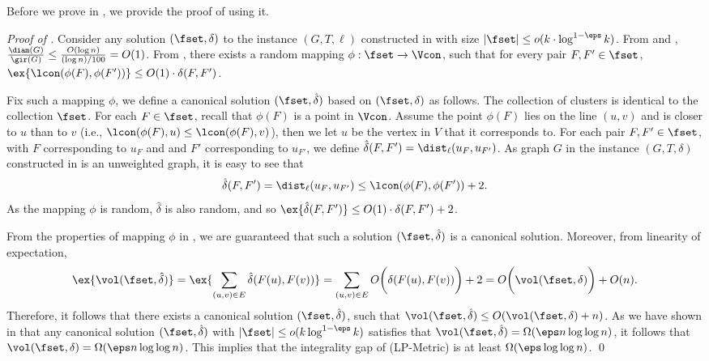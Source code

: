 Before we prove  in , we provide the proof of  using it.

\emph{Proof of .}
Consider any solution $(\fset,\delta)$ to the instance $(G,T,\ell)$ constructed in  with size $|\fset|\le o(k\cdot \log^{1-\eps}k)$. 
From  and , $\frac{\diam(G)}{\gir(G)}\le \frac{O(\log n)}{(\log n)/100}=O(1)$. From , there exists a random mapping $\phi: \fset \to \Vcon$, such that for every pair $F,F'\in \fset$,
$\ex{\lcon(\phi(F),\phi(F'))} \le O(1)\cdot  \delta(F,F')$. 

Fix such a mapping $\phi$, we define a canonical solution $(\fset,\hat \delta)$ based on $(\fset,\delta)$ as follows. The collection of clusters is identical to the collection $\fset$. For each $F\in \fset$, recall that $\phi(F)$ is a point in $\Vcon$. Assume the point $\phi(F)$ lies on the line $(u,v)$ and is closer to $u$ than to $v$ (i.e., $\lcon(\phi(F),u)\le\lcon(\phi(F),v)$), then we let $u$ be the vertex in $V$ that it corresponds to. For each pair $F,F'\in \fset$, with $F$ corresponding to $u_F$ and and $F'$ corresponding to $u_{F'}$, we define $\hat\delta(F,F')=\dist_{\ell}(u_F,u_{F'})$. 
As graph $G$ in the instance $(G,T,\delta)$ constructed in  is an unweighted graph, it is easy to see that
\[\hat\delta(F,F')=\dist_{\ell}(u_F,u_{F'})\le \lcon(\phi(F),\phi(F'))+2.\]
As the mapping $\phi$ is random, $\hat{\delta}$ is also random, and so $\ex{\hat\delta(F,F')}\le O(1)\cdot  \delta(F,F') +2$.

From the properties of mapping $\phi$ in , we are guaranteed that such a solution $(\fset,\hat\delta)$ is a canonical solution. Moreover, from linearity of expectation, 
$$\ex{\vol(\fset,\hat\delta)}
=\ex{\sum_{(u,v)\in E}\hat\delta(F(u),F(v))}
=\sum_{(u,v)\in E}O\bigg(\delta(F(u),F(v))\bigg)+2
=O\bigg(\vol(\fset,\delta)\bigg)+O(n).
$$
Therefore, it follows that there exists a canonical solution $(\fset,\hat\delta)$, such that $\vol(\fset,\hat\delta)\le O(\vol(\fset,\delta)+n)$.
As we have shown in  that any canonical solution $(\fset,\hat\delta)$ with $|\fset|\le o(k\log^{1-\eps}k)$ satisfies that $\vol(\fset,\hat\delta)=\Omega(\eps n\log\log n)$, it follows that $\vol(\fset,\delta)=\Omega(\eps n\log\log n)$.
This implies that the integrality gap of (\textsf{LP-Metric}) is at least $\Omega(\eps \log\log n)$.
\qed






